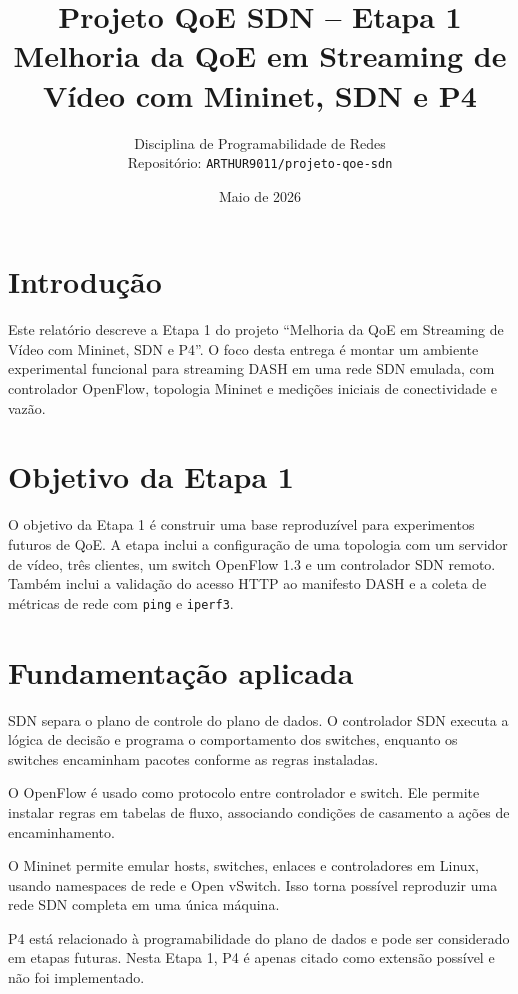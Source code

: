 \documentclass[12pt,a4paper]{article}
\title{\textbf{Projeto QoE SDN -- Etapa 1}\\
\large Melhoria da QoE em Streaming de Vídeo com Mininet, SDN e P4}
\author{Disciplina de Programabilidade de Redes\\
Repositório: \texttt{ARTHUR9011/projeto-qoe-sdn}}
\date{Maio de 2026}
\begin{document}
\maketitle
\thispagestyle{empty}
\newpage

\tableofcontents
\newpage

\section{Introdução}

Este relatório descreve a Etapa 1 do projeto ``Melhoria da QoE em Streaming de Vídeo com Mininet, SDN e P4''. O foco desta entrega é montar um ambiente experimental funcional para streaming DASH em uma rede SDN emulada, com controlador OpenFlow, topologia Mininet e medições iniciais de conectividade e vazão.

\section{Objetivo da Etapa 1}

O objetivo da Etapa 1 é construir uma base reproduzível para experimentos futuros de QoE. A etapa inclui a configuração de uma topologia com um servidor de vídeo, três clientes, um switch OpenFlow 1.3 e um controlador SDN remoto. Também inclui a validação do acesso HTTP ao manifesto DASH e a coleta de métricas de rede com \texttt{ping} e \texttt{iperf3}.

\section{Fundamentação aplicada}

SDN separa o plano de controle do plano de dados. O controlador SDN executa a lógica de decisão e programa o comportamento dos switches, enquanto os switches encaminham pacotes conforme as regras instaladas.

O OpenFlow é usado como protocolo entre controlador e switch. Ele permite instalar regras em tabelas de fluxo, associando condições de casamento a ações de encaminhamento.

O Mininet permite emular hosts, switches, enlaces e controladores em Linux, usando namespaces de rede e Open vSwitch. Isso torna possível reproduzir uma rede SDN completa em uma única máquina.

P4 está relacionado à programabilidade do plano de dados e pode ser considerado em etapas futuras. Nesta Etapa 1, P4 é apenas citado como extensão possível e não foi implementado.
\end{document}
